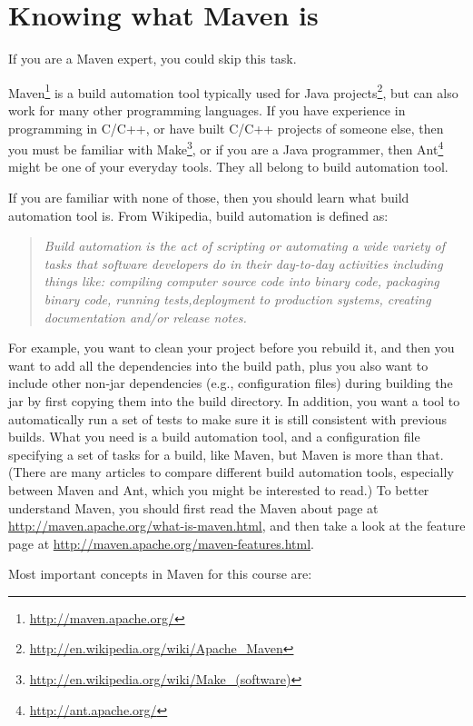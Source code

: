 
\section{Knowing what Maven is}

If you are a Maven expert, you could skip this task.

Maven\footnote{\url{http://maven.apache.org/}} is a build automation tool
typically used for Java
projects\footnote{\url{http://en.wikipedia.org/wiki/Apache_Maven}}, but can also
work for many other programming languages. If you have experience in programming
in C/C++, or have built C/C++ projects of someone else, then you must be
familiar with Make\footnote{\url{http://en.wikipedia.org/wiki/Make_(software)}},
or if you are a Java programmer, then Ant\footnote{\url{http://ant.apache.org/}}
might be one of your everyday tools. They all belong to build automation tool.

If you are familiar with none of those, then you should learn what build
automation tool is. From Wikipedia, build automation is defined as:

\begin{quote}
\emph{Build automation is the act of scripting or automating a wide variety of
tasks that software developers do in their day-to-day activities including
things like: compiling computer source code into binary code, packaging binary
code, running tests,deployment to production systems, creating documentation
and/or release notes.}
\end{quote}

For example, you want to clean your project before you rebuild it, and then you
want to add all the dependencies into the build path, plus you also want to
include other non-jar dependencies (e.g., configuration files) during building
the jar by first copying them into the build directory. In addition, you want a
tool to automatically run a set of tests to make sure it is still consistent
with previous builds. What you need is a build automation tool, and a
configuration file specifying a set of tasks for a build, like Maven, but Maven
is more than that. (There are many articles to compare different build
automation tools, especially between Maven and Ant, which you might be
interested to read.) To better understand Maven, you should first read the Maven
about page at \url{http://maven.apache.org/what-is-maven.html}, and then take a
look at the feature page at \url{http://maven.apache.org/maven-features.html}.

Most important concepts in Maven for this course are:

